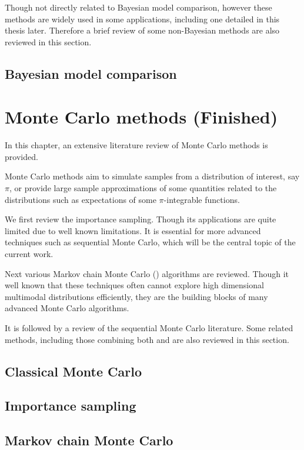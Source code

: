 \documentclass[11pt, fontset=Minion, showoverfull, toclevel=2,
bib, biblatexstyle=numeric, mintcode, minted=cache]{marticle}
\begin{document}
Though not directly related to Bayesian model comparison, however these
methods are widely used in some applications, including one detailed in this
thesis later. Therefore a brief review of some non-Bayesian methods are also
reviewed in this section.

\subsection{Bayesian model comparison}

\section{Monte Carlo methods (Finished)}

In this chapter, an extensive literature review of Monte Carlo methods is
provided.

Monte Carlo methods aim to simulate samples from a distribution of interest,
say $\pi$, or provide large sample approximations of some quantities related
to the distributions such as expectations of some $\pi$-integrable functions.

We first review the importance sampling. Though its applications are quite
limited due to well known limitations. It is essential for more advanced
techniques such as sequential Monte Carlo, which will be the central topic of
the current work.

Next various Markov chain Monte Carlo (\mcmc) algorithms are reviewed. Though
it well known that these techniques often cannot explore high dimensional
multimodal distributions efficiently, they are the building blocks of many
advanced Monte Carlo algorithms.

It is followed by a review of the sequential Monte Carlo literature. Some
related methods, including those combining both \smc and \mcmc are also
reviewed in this section.

\subsection{Classical Monte Carlo}

\subsection{Importance sampling}

\subsection{Markov chain Monte Carlo}
\end{document}
